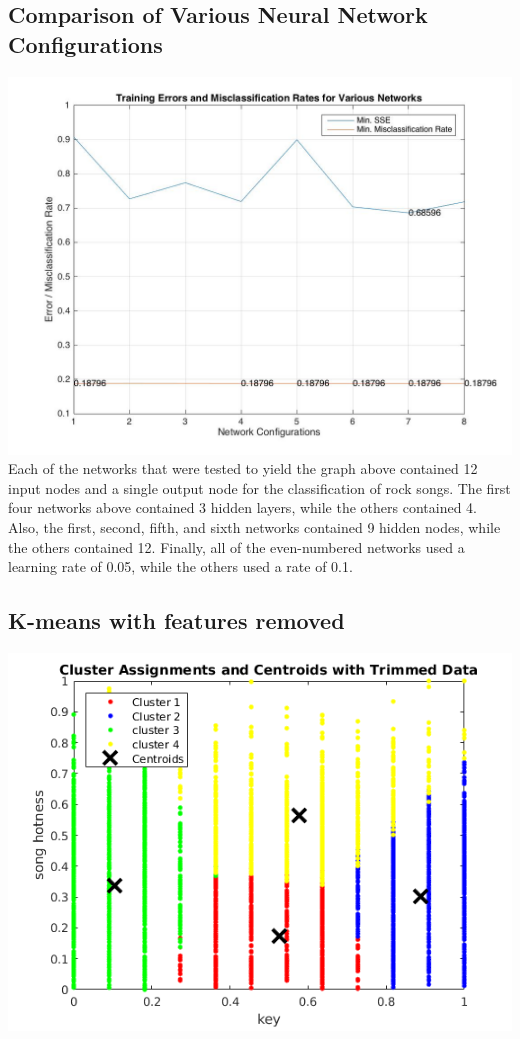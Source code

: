 \documentclass[12pt]{article}
\begin{document}
\subsection{Comparison of Various Neural Network Configurations}
\label{subsec:variousANN}
\includegraphics[scale=0.3]{images/ann/graphOfVariousNetworksWith1Genre}
\\
Each of the networks that were tested to yield the graph above contained 12 input nodes and a single output node for the classification of rock songs. The first four networks above contained 3 hidden layers, while the others contained 4. Also, the first, second, fifth, and sixth networks contained 9 hidden nodes, while the others contained 12. Finally, all of the even-numbered networks used a learning rate of 0.05, while the others used a rate of 0.1.
\subsection{K-means with features removed}
\label{subsec:trimmedKmeans}
\includegraphics[scale=0.6]{images/clustering/trimmedkMeans}
\end{document}
